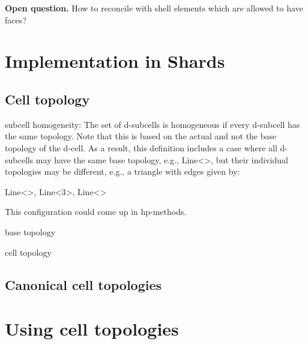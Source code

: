 \documentclass[pdf,12pt,relaxed]{SANDreport}
\begin{document}
\textbf{Open question.} How to reconcile with shell elements which are allowed to have faces?





    
    
    \section{Implementation in Shards}\label{sec:implementation}
    
    
        
    
    \subsection{Cell topology}
   
    
    
    subcell homogeneity: The set of d-subcells is homogeneous if every d-subcell has the same topology.
    Note that this is based on the actual and not the base topology of the d-cell. As a result, this definition includes a case where all d-subcells may have the same base topology, e.g., Line<>, but their individual topologies may be different, e.g., a triangle with edges given by:

Line<>, Line<3>, Line<>

This configuration could come up in hp-methods.

    
    
    base topology
    
    cell topology

    
    
    
    \subsection{Canonical cell topologies}\label{sec:canonical}
    
     

   \section{Using cell topologies}\label{sec:using}
\end{document}
